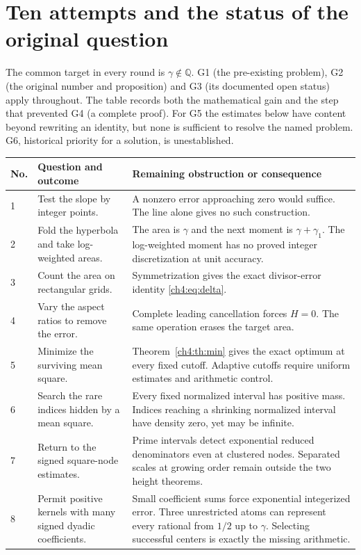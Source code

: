 \documentclass[11pt,a4paper,oneside,openany]{report}
\theoremstyle{remark}\newtheorem{remark}[theorem]{Remark}
\numberwithin{equation}{section}
\begin{document}
\section{Ten attempts and the status of the original question}\label{ch4:sec:audit}
The common target in every round is $\gamma\notin\mathbb Q$. G1 (the pre-existing problem), G2 (the original number and proposition) and G3 (its documented open status) apply throughout. The table records both the mathematical gain and the step that prevented G4 (a complete proof). For G5 the estimates below have content beyond rewriting an identity, but none is sufficient to resolve the named problem. G6, historical priority for a solution, is unestablished.
\par\medskip\begin{small}
\renewcommand{\arraystretch}{1.19}
\noindent\begin{tabular}{@{}l>{\raggedright\arraybackslash}p{.39\linewidth}>{\raggedright\arraybackslash}p{.48\linewidth}@{}}
\toprule
No. & Question and outcome & Remaining obstruction or consequence\\\midrule
1 & Test the slope by integer points. & A nonzero error approaching zero would suffice. The line alone gives no such construction.\\
2 & Fold the hyperbola and take log-weighted areas. & The area is $\gamma$ and the next moment is $\gamma+\gamma_1$. The log-weighted moment has no proved integer discretization at unit accuracy.\\
3 & Count the area on rectangular grids. & Symmetrization gives the exact divisor-error identity \eqref{ch4:eq:delta}.\\
4 & Vary the aspect ratios to remove the error. & Complete leading cancellation forces $H=0$. The same operation erases the target area.\\
5 & Minimize the surviving mean square. & Theorem~\ref{ch4:th:min} gives the exact optimum at every fixed cutoff. Adaptive cutoffs require uniform estimates and arithmetic control.\\
6 & Search the rare indices hidden by a mean square. & Every fixed normalized interval has positive mass. Indices reaching a shrinking normalized interval have density zero, yet may be infinite.\\
7 & Return to the signed square-node estimates. & Prime intervals detect exponential reduced denominators even at clustered nodes. Separated scales at growing order remain outside the two height theorems.\\
8 & Permit positive kernels with many signed dyadic coefficients. & Small coefficient sums force exponential integerized error. Three unrestricted atoms can represent every rational from $1/2$ up to $\gamma$. Selecting successful centers is exactly the missing arithmetic.\\

\end{tabular}
\end{small}
\end{document}

